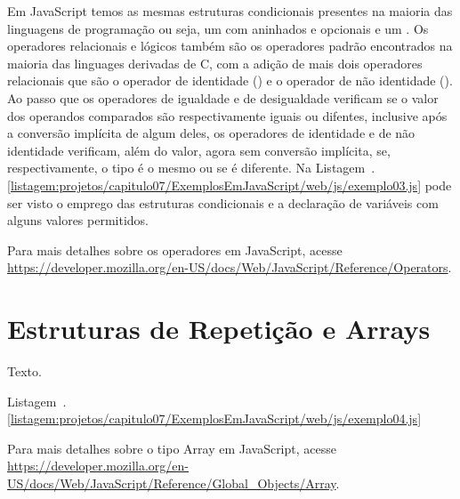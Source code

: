 Em JavaScript temos as mesmas estruturas condicionais presentes na maioria das linguagens de programação ou seja, um  com  aninhados e opcionais e um . Os operadores relacionais e lógicos também são os operadores padrão encontrados na maioria das linguages derivadas de C, com a adição de mais dois operadores relacionais que são o operador de identidade (\inlineJavaScriptCode{===}) e o operador de não identidade (\inlineJavaScriptCode{!==}). Ao passo que os operadores de igualdade e de desigualdade verificam se o valor dos operandos comparados são respectivamente iguais ou difentes, inclusive após a conversão implícita de algum deles, os operadores de identidade e de não identidade verificam, além do valor, agora sem conversão implícita, se, respectivamente, o tipo é o mesmo ou se é diferente. Na Listagem~\thechapter.\ref{listagem:projetos/capitulo07/ExemplosEmJavaScript/web/js/exemplo03.js} pode ser visto o emprego das estruturas condicionais e a declaração de variáveis com alguns valores permitidos.


\begin{saibaMais}
    Para mais detalhes sobre os operadores em JavaScript, acesse \url{https://developer.mozilla.org/en-US/docs/Web/JavaScript/Reference/Operators}.
\end{saibaMais}


\section{Estruturas de Repetição e Arrays}

Texto.

Listagem~\thechapter.\ref{listagem:projetos/capitulo07/ExemplosEmJavaScript/web/js/exemplo04.js}


\begin{saibaMais}
    Para mais detalhes sobre o tipo Array em JavaScript, acesse \url{https://developer.mozilla.org/en-US/docs/Web/JavaScript/Reference/Global_Objects/Array}.
\end{saibaMais}

